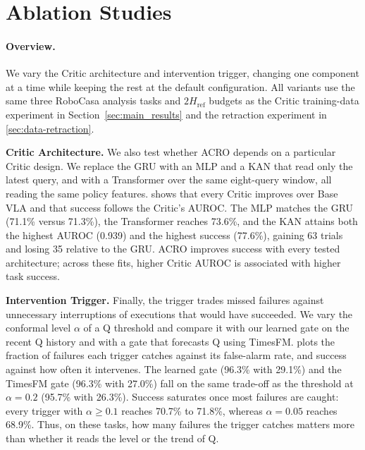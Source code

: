 \section{Ablation Studies}
\label{sec:ablations}
\paragraph{Overview.}
We vary the Critic architecture and intervention trigger, changing one component at a time while keeping the rest at the default configuration. All variants use the same three RoboCasa analysis tasks and $2H_{\mathrm{ref}}$ budgets as the Critic training-data experiment in Section~\ref{sec:main_results} and the retraction experiment in \cref{sec:data-retraction}.



\noindent\textbf{Critic Architecture.}
We also test whether ACRO depends on a particular Critic design. We replace the GRU with an MLP and a KAN that read only the latest query, and with a Transformer over the same eight-query window, all reading the same policy features.  shows that every Critic improves over Base VLA and that success follows the Critic's AUROC. The MLP matches the GRU (71.1\% versus 71.3\%), the Transformer reaches 73.6\%, and the KAN attains both the highest AUROC (0.939) and the highest success (77.6\%), gaining 63 trials and losing 35 relative to the GRU. ACRO improves success with every tested architecture; across these fits, higher Critic AUROC is associated with higher task success.



\noindent\textbf{Intervention Trigger.}
Finally, the trigger trades missed failures against unnecessary interruptions of executions that would have succeeded. We vary the conformal level $\alpha$ of a Q threshold and compare it with our learned gate on the recent Q history and with a gate that forecasts Q using TimesFM.  plots the fraction of failures each trigger catches against its false-alarm rate, and success against how often it intervenes. The learned gate (96.3\% with 29.1\%) and the TimesFM gate (96.3\% with 27.0\%) fall on the same trade-off as the threshold at $\alpha=0.2$ (95.7\% with 26.3\%). Success saturates once most failures are caught: every trigger with $\alpha\ge0.1$ reaches 70.7\% to 71.8\%, whereas $\alpha=0.05$ reaches 68.9\%. Thus, on these tasks, how many failures the trigger catches matters more than whether it reads the level or the trend of Q.

\FloatBarrier
